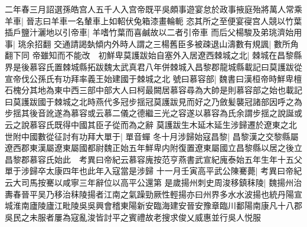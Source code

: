 二年春三月詔選孫皓宫人五千人入宫帝既平吳頗事遊宴怠於政事掖庭殆將萬人常乘羊車|{
	晉志曰羊車一名輦車上如軺伏兔箱漆畫輪軛}
恣其所之至便宴寑宫人競以竹葉插戶鹽汁灑地以引帝車|{
	羊嗜竹葉而喜鹹故以二者引帝車}
而后父楊駿及弟珧濟始用事|{
	珧余招翻}
交通請謁埶傾内外時人謂之三楊舊臣多被疎退山濤數有規諷|{
	數所角翻下同}
帝雖知而不能改　初鮮卑莫護跋始自塞外入居遼西棘城之北|{
	棘城在昌黎縣界是後慕容氏置棘城縣拓跋魏太武真君八年併棘城入昌黎郡龍城縣載記曰莫護跋從宣帝伐公孫氏有功拜率義王始建國于棘城之北}
號曰慕容部|{
	魏書曰漢桓帝時鮮卑檀石槐分其地為東中西三部中部大人曰柯最闕居慕容尋為大帥是則慕容部之始也載記曰莫護跋國于棘城之北時燕代多冠步揺冠莫護跋見而好之乃斂髪襲冠諸部因呼之為步揺其後音訛遂為慕容或云慕二儀之德繼三光之容遂以慕容為氏余謂步揺之說誕或云之說慕容氏既得中國其臣子從而為之辭}
莫護跋生木延木延生涉歸遷於遼東之北世附中國數從征討有功拜大單于|{
	單音蟬}
冬十月涉歸始寇昌黎|{
	昌黎漢之交黎縣屬遼西郡東漢屬遼東屬國都尉魏正始五年鮮卑内附復置遼東屬國立昌黎縣以居之後立昌黎郡慕容氏始此　考異曰帝紀云慕容廆按范亨燕書武宣紀廆泰始五年生年十五父單于涉歸卒太康四年也此年入寇當是涉歸}
十一月壬寅高平武公陳騫薨|{
	考異曰帝紀云大司馬按騫以咸寧三年辭位以高平公還第}
是歲揚州刺史周浚移鎮秣陵|{
	魏揚州治夀春晉平吴乃移治秣陵揚者江南之氣躁勁厥性輕揚亦曰州界多水水波揚也統丹陽宣城淮南廬陵廬江毗陵吳吳興會稽東陽新安臨海建安晉安豫章臨川鄱陽南康凡十八郡}
吳民之未服者屢為寇亂浚皆討平之賓禮故老搜求俊乂威惠並行吳人悦服

